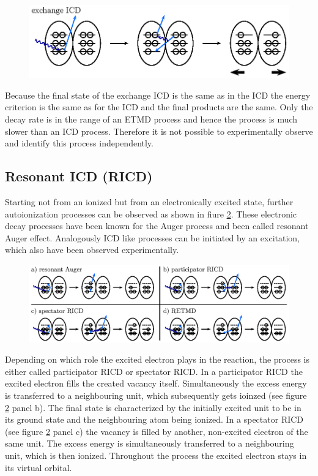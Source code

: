 \begin{figure}[h]
 \centering
 \includegraphics{pics/exicd-pspic.eps}
 \caption{}
 \label{figure:exICD_process}
\end{figure}

Because the final state of the exchange ICD is the same as in the ICD the energy
criterion is the same as for the ICD and the final products are the same. Only
the decay rate is in the range of an ETMD process and hence the process is much
slower than an ICD process. Therefore it is not possible to experimentally
observe and identify this process independently.


\subsection{Resonant ICD (RICD)}
Starting not from an ionized but from an electronically excited state, further
autoionization processes can be observed
as shown in fiure \ref{figure:ricd_processes}.
These electronic decay processes have been known for
the Auger process and been called resonant Auger effect. Analogously ICD like
processes can be initiated by an excitation, which also have been observed
experimentally.

\begin{figure}[h]
 \centering
 \includegraphics{pics/ricd-pspic.eps}
 \caption{}
 \label{figure:ricd_processes}
\end{figure}

Depending on which role the excited
electron plays in the reaction, the process is either called participator \ac{RICD}
or spectator \ac{RICD}.
In a participator \ac{RICD} the excited electron fills the created vacancy itself.
Simultaneously the excess energy is transferred to a neighbouring unit, which
subsequently gets ioinzed (see figure \ref{figure:ricd_processes} panel b).
The final state is characterized
by the initially excited unit to be in its ground state and the neighbouring atom
being ionized.
In a spectator \ac{RICD} (see figure \ref{figure:ricd_processes} panel c)
the vacancy is filled by another, non-excited electron
of the same unit. The excess energy is simultaneously transferred to a neighbouring
unit, which is then ionized. Throughout the process the excited electron stays
in its virtual orbital.

